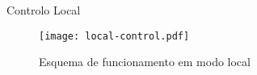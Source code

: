 \begin{frame}{Controlo Local}
	\begin{figure}
		\centering
		\texttt{[image: local-control.pdf]}
		\caption{Esquema de funcionamento em modo local}
	\end{figure}
\end{frame}